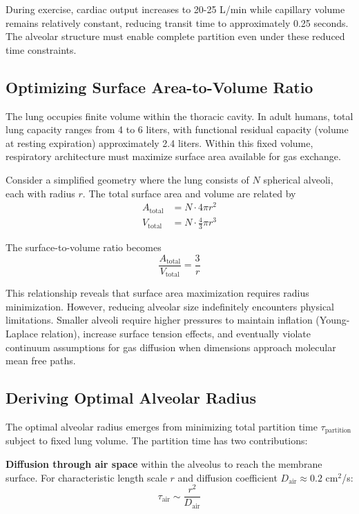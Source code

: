 During exercise, cardiac output increases to 20-25 L/min while capillary volume remains relatively constant, reducing transit time to approximately 0.25 seconds. The alveolar structure must enable complete partition even under these reduced time constraints.

\subsection{Optimizing Surface Area-to-Volume Ratio}

The lung occupies finite volume within the thoracic cavity. In adult humans, total lung capacity ranges from 4 to 6 liters, with functional residual capacity (volume at resting expiration) approximately 2.4 liters. Within this fixed volume, respiratory architecture must maximize surface area available for gas exchange.

Consider a simplified geometry where the lung consists of $N$ spherical alveoli, each with radius $r$. The total surface area and volume are related by
\begin{align}
A_{\mathrm{total}} &= N \cdot 4\pi r^{2} \\
V_{\mathrm{total}} &= N \cdot \frac{4}{3}\pi r^{3}
\end{align}

The surface-to-volume ratio becomes
\begin{equation}
\frac{A_{\mathrm{total}}}{V_{\mathrm{total}}} = \frac{3}{r}
\end{equation}

This relationship reveals that surface area maximization requires radius minimization. However, reducing alveolar size indefinitely encounters physical limitations. Smaller alveoli require higher pressures to maintain inflation (Young-Laplace relation), increase surface tension effects, and eventually violate continuum assumptions for gas diffusion when dimensions approach molecular mean free paths.

\subsection{Deriving Optimal Alveolar Radius}

The optimal alveolar radius emerges from minimizing total partition time $\tau_{\mathrm{partition}}$ subject to fixed lung volume. The partition time has two contributions:

\textbf{Diffusion through air space} within the alveolus to reach the membrane surface. For characteristic length scale $r$ and diffusion coefficient $D_{\mathrm{air}} \approx 0.2$ cm$^{2}$/s:
\begin{equation}
\tau_{\mathrm{air}} \sim \frac{r^{2}}{D_{\mathrm{air}}}
\end{equation}

